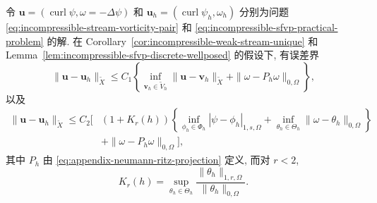 \begin{Theorem}\label{thm:incompressible-sfvp-velocity-vorticity-error}
令
$\mathbf u=(\operatorname{curl}\psi,\omega=-\Delta\psi)$
和 $\mathbf u_h=(\operatorname{curl}\psi_h,\omega_h)$
分别为问题 \eqref{eq:incompressible-stream-vorticity-pair}
和 \eqref{eq:incompressible-sfvp-practical-problem} 的解.
在 Corollary~\ref{cor:incompressible-weak-stream-unique}
和 Lemma~\ref{lem:incompressible-sfvp-discrete-wellposed} 的假设下,
有误差界
\begin{equation}\label{eq:incompressible-sfvp-quasioptimal-error}
\|\mathbf u-\mathbf u_h\|_{\widetilde X}
\leq C_1\left\{
\inf_{\mathbf v_h\in\widetilde V_h}
\|\mathbf u-\mathbf v_h\|_{\widetilde X}
+\|\omega-P_h\omega\|_{0,\Omega}
\right\},
\end{equation}
以及
\begin{equation}\label{eq:incompressible-sfvp-expanded-error}
\begin{split}
\|\mathbf u-\mathbf u_h\|_{\widetilde X}
\leq C_2\biggl[&(1+K_r(h))
\left\{
\inf_{\phi_h\in\Phi_h}|\psi-\phi_h|_{1,s,\Omega}
+\inf_{\theta_h\in\Theta_h}
\|\omega-\theta_h\|_{0,\Omega}
\right\}\\
&+\|\omega-P_h\omega\|_{0,\Omega}\biggr],
\end{split}
\end{equation}
其中 $P_h$ 由 \eqref{eq:appendix-neumann-ritz-projection} 定义,
而对 $r<2$,
\[
K_r(h)=\sup_{\theta_h\in\Theta_h}
\frac{\|\theta_h\|_{1,r,\Omega}}
{\|\theta_h\|_{0,\Omega}}.
\]
\end{Theorem}

